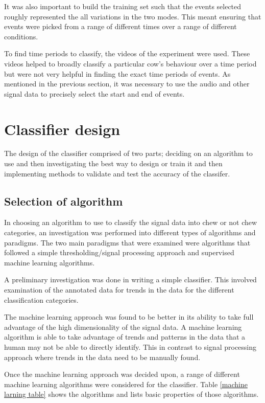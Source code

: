 It was also important to build the training set such that the events selected roughly represented the all variations in the two modes. This meant ensuring that events were picked from a range of different times over a range of different conditions.

To find time periods to classify, the videos of the experiment were used. These videos helped to broadly classify a particular cow's behaviour over a time period but were not very helpful in finding the exact time periods of events. As mentioned in the previous section, it was necessary to use the audio and other signal data to precisely select the start and end of events. 

\section{Classifier design}

The design of the classifier comprised of two parts; deciding on an algorithm to use and then investigating the best way to design or train it and then implementing methods to validate and test the accuracy of the classifer.  

\subsection{Selection of algorithm}

In choosing an algorithm to use to classify the signal data into chew or not chew categories, an investigation was performed into different types of algorithms and paradigms. The two main paradigms that were examined were algorithms that followed a simple thresholding/signal processing approach and supervised machine learning algorithms. 

A preliminary investigation was done in writing a simple classifier. This involved examination of the annotated data for trends in the data for the different classification categories.  

The machine learning approach was found to be better in its ability to take full advantage of the high dimensionality of the signal data. A machine learning algorithm is able to take advantage of trends and patterns in the data that a human may not be able to directly identify. This in contrast to signal processing approach where trends in the data need to be manually found.

Once the machine learning approach was decided upon, a range of different machine learning algorithms were considered for the classifier. Table \ref{machine larning table} shows the algorithms and lists basic properties of those algorithms. 

